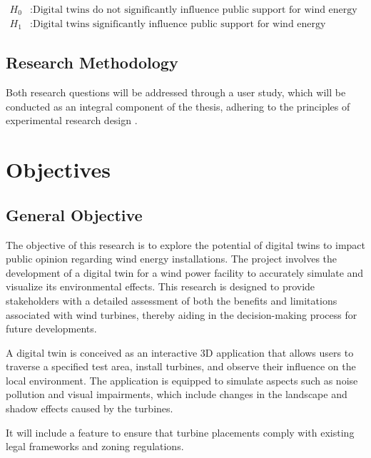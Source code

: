 \documentclass[11pt, titlepage, a4paper]{scrartcl}
\begin{document}
\begin{linenumbers}
    \begin{align}
        H_0 & : \text{Digital twins do not significantly influence public support for wind energy projects.} \\
        H_1 & : \text{Digital twins significantly influence public support for wind energy projects.}
    \end{align}

    \subsection{Research Methodology}

    Both research questions will be addressed through a user study, which will be conducted as an integral component of the thesis, adhering to the principles of experimental research design \cite{lazarResearchMethodsHuman2017}.

    \section{Objectives}
    \subsection{General Objective}
    The objective of this research is to explore the potential of digital twins to impact public opinion regarding wind energy installations. The project involves the development of a digital twin for a wind power facility to accurately simulate and visualize its environmental effects. This research is designed to provide stakeholders with a detailed assessment of both the benefits and limitations associated with wind turbines, thereby aiding in the decision-making process for future developments.

    A digital twin is conceived as an interactive 3D application that allows users to traverse a specified test area, install turbines, and observe their influence on the local environment. The application is equipped to simulate aspects such as noise pollution and visual impairments, which include changes in the landscape and shadow effects caused by the turbines.

    It will include a feature to ensure that turbine placements comply with existing legal frameworks and zoning regulations.


\end{linenumbers}
\end{document}
